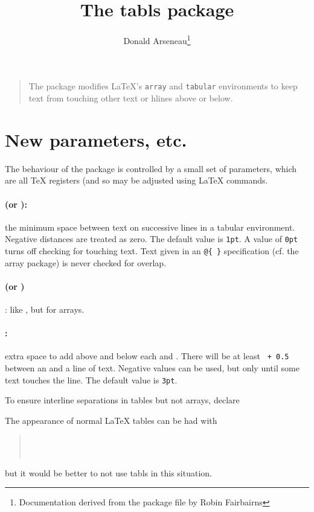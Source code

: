 \documentclass[a4paper]{article}
\begin{document}
\title{The \textsf{tabls} package}
\author{Donald Arseneau\thanks{Documentation derived from the package
    file by Robin Fairbairns}}
\maketitle
\begin{quote}
  The package modifies \LaTeX{}'s \texttt{array} and \texttt{tabular}
  environments to keep text from touching other text or hlines above
  or below.
\end{quote}
\section{New parameters, etc.}

The behaviour of the package is controlled by a small set of
parameters, which are all \TeX{}  registers (and so may be
adjusted using \LaTeX{}  commands.

\paragraph{ (or ):} the minimum space
between text on successive lines in a tabular environment.  Negative
distances are treated as zero.  The default value is \texttt{1pt}.  A
value of \texttt{0pt} turns off checking for touching text.  Text
given in an \verb|@{ }| specification (cf. the \textsf{array} package)
is never checked for overlap.

\paragraph{ (or )}: like
, but for arrays.

\paragraph{:} extra space to add above and below each
 and . There will be at least
\texttt{ + 0.5} between an 
and a line of text.  Negative values can be used, but only until some
text touches the line.  The default value is \texttt{3pt}.

\noindent To ensure interline separations in tables but not arrays,
declare
\begin{quote}
\end{quote}
\noindent The appearance of normal \LaTeX{} tables can be had with
\begin{quote}
  \\
  \\
\end{quote}
\noindent but it would be better to not use \textsf{tabls} in this
situation.
\end{document}
